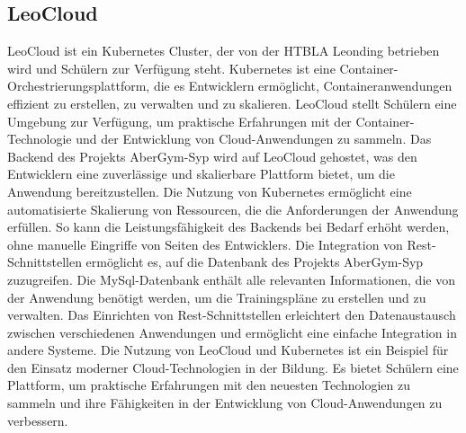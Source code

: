 \subsection{LeoCloud}
LeoCloud ist ein Kubernetes Cluster, der von der HTBLA Leonding betrieben wird und Schülern zur Verfügung steht. Kubernetes ist eine Container-Orchestrierungsplattform, die es Entwicklern ermöglicht, Containeranwendungen effizient zu erstellen, zu verwalten und zu skalieren. LeoCloud stellt Schülern eine Umgebung zur Verfügung, um praktische Erfahrungen mit der Container-Technologie und der Entwicklung von Cloud-Anwendungen zu sammeln.
\newline
\newline
Das Backend des Projekts AberGym-Syp wird auf LeoCloud gehostet, was den Entwicklern eine zuverlässige und skalierbare Plattform bietet, um die Anwendung bereitzustellen. Die Nutzung von Kubernetes ermöglicht eine automatisierte Skalierung von Ressourcen, die die Anforderungen der Anwendung erfüllen. So kann die Leistungsfähigkeit des Backends bei Bedarf erhöht werden, ohne manuelle Eingriffe von Seiten des Entwicklers.
\newline
\newline
Die Integration von Rest-Schnittstellen ermöglicht es, auf die Datenbank des Projekts AberGym-Syp zuzugreifen. Die MySql-Datenbank enthält alle relevanten Informationen, die von der Anwendung benötigt werden, um die Trainingspläne zu erstellen und zu verwalten. Das Einrichten von Rest-Schnittstellen erleichtert den Datenaustausch zwischen verschiedenen Anwendungen und ermöglicht eine einfache Integration in andere Systeme.
\newline
\newline
Die Nutzung von LeoCloud und Kubernetes ist ein Beispiel für den Einsatz moderner Cloud-Technologien in der Bildung. Es bietet Schülern eine Plattform, um praktische Erfahrungen mit den neuesten Technologien zu sammeln und ihre Fähigkeiten in der Entwicklung von Cloud-Anwendungen zu verbessern.